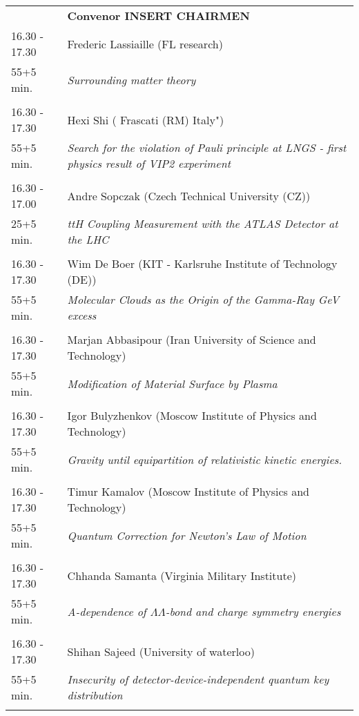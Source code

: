 \begin{longtable}{p{3cm}p{13cm}}
&\hfill {\bf Convenor INSERT CHAIRMEN }\\ 
16.30 - 17.30 & Frederic Lassiaille (FL research)\\ 
55+5 min. & {\it Surrounding matter theory}\\ 
 & \\ 
16.30 - 17.30 & Hexi Shi ( Frascati (RM) Italy")\\ 
55+5 min. & {\it Search for the violation of Pauli principle at LNGS - first physics result of VIP2 experiment}\\ 
 & \\ 
16.30 - 17.00 & Andre Sopczak (Czech Technical University (CZ))\\ 
25+5 min. & {\it ttH Coupling Measurement with the ATLAS Detector at the LHC}\\ 
 & \\ 
16.30 - 17.30 & Wim De Boer (KIT - Karlsruhe Institute of  Technology (DE))\\ 
55+5 min. & {\it Molecular Clouds as the Origin of the Gamma-Ray GeV excess}\\ 
 & \\ 
16.30 - 17.30 & Marjan Abbasipour (Iran University of Science and Technology)\\ 
55+5 min. & {\it Modification of Material Surface by Plasma}\\ 
 & \\ 
16.30 - 17.30 & Igor Bulyzhenkov (Moscow Institute of Physics and Technology)\\ 
55+5 min. & {\it Gravity until equipartition of relativistic kinetic energies.}\\ 
 & \\ 
16.30 - 17.30 & Timur Kamalov (Moscow Institute of Physics and Technology)\\ 
55+5 min. & {\it Quantum Correction for Newton’s Law of Motion}\\ 
 & \\ 
16.30 - 17.30 & Chhanda Samanta (Virginia Military Institute)\\ 
55+5 min. & {\it A-dependence of $\Lambda\Lambda$-bond and charge symmetry energies}\\ 
 & \\ 
16.30 - 17.30 & Shihan Sajeed (University of waterloo)\\ 
55+5 min. & {\it Insecurity of detector-device-independent quantum key distribution}\\ 
 & \\ 

\end{longtable}
